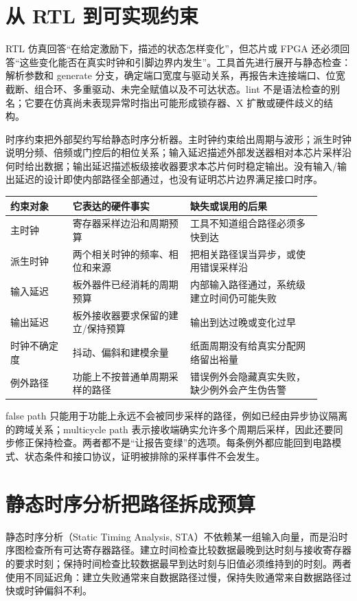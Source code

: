 \section{从 RTL 到可实现约束}

RTL 仿真回答“在给定激励下，描述的状态怎样变化”，但芯片或 FPGA 还必须回答“这些变化能否在真实时钟和引脚边界内发生”。工具首先进行展开与静态检查：解析参数和 generate 分支，确定端口宽度与驱动关系，再报告未连接端口、位宽截断、组合环、多重驱动、未完全赋值以及不可达状态。lint 不是语法检查的别名；它要在仿真尚未表现异常时指出可能形成锁存器、X 扩散或硬件歧义的结构。

时序约束把外部契约写给静态时序分析器。主时钟约束给出周期与波形；派生时钟说明分频、倍频或门控后的相位关系；输入延迟描述外部发送器相对本芯片采样沿何时给出数据；输出延迟描述板级接收器要求本芯片何时稳定输出。没有输入/输出延迟的设计即使内部路径全部通过，也没有证明芯片边界满足接口时序。

\begin{longtable}{L{0.18\linewidth}L{0.34\linewidth}L{0.38\linewidth}}
\toprule
约束对象 & 它表达的硬件事实 & 缺失或误用的后果 \\
\midrule
主时钟 & 寄存器采样边沿和周期预算 & 工具不知道组合路径必须多快到达 \\
派生时钟 & 两个相关时钟的频率、相位和来源 & 把相关路径误当异步，或使用错误采样沿 \\
输入延迟 & 板外器件已经消耗的周期预算 & 内部输入路径通过，系统级建立时间仍可能失败 \\
输出延迟 & 板外接收器要求保留的建立/保持预算 & 输出到达过晚或变化过早 \\
时钟不确定度 & 抖动、偏斜和建模余量 & 纸面周期没有给真实分配网络留出裕量 \\
例外路径 & 功能上不按普通单周期采样的路径 & 错误例外会隐藏真实失败，缺少例外会产生伪告警 \\
\bottomrule
\end{longtable}

false path 只能用于功能上永远不会被同步采样的路径，例如已经由异步协议隔离的跨域关系；multicycle path 表示接收端确实允许多个周期后采样，因此还要同步修正保持检查。两者都不是“让报告变绿”的选项。每条例外都应能回到电路模式、状态条件和接口协议，证明被排除的采样事件不会发生。

\section{静态时序分析把路径拆成预算}

静态时序分析（Static Timing Analysis, STA）不依赖某一组输入向量，而是沿时序图检查所有可达寄存器路径。建立时间检查比较数据最晚到达时刻与接收寄存器的要求时刻；保持时间检查比较数据最早到达时刻与旧值必须维持到的时刻。两者使用不同延迟角：建立失败通常来自数据路径过慢，保持失败通常来自数据路径过快或时钟偏斜不利。

